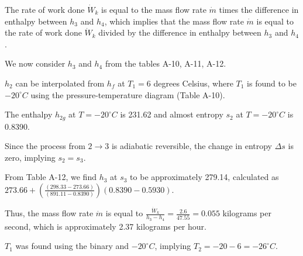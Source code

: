 The rate of work done \( \dot{W}_k \) is equal to the mass flow rate \( \dot{m} \) times the difference in enthalpy between \( h_3 \) and \( h_4 \), which implies that the mass flow rate \( \dot{m} \) is equal to the rate of work done \( \dot{W}_k \) divided by the difference in enthalpy between \( h_3 \) and \( h_4 \).

We now consider \( h_3 \) and \( h_4 \) from the tables A-10, A-11, A-12.

\( h_2 \) can be interpolated from \( h_f \) at \( T_1 = 6 \) degrees Celsius, where \( T_1 \) is found to be \(-20^\circ C\) using the pressure-temperature diagram (Table A-10).

The enthalpy \( h_{2g} \) at \( T = -20^\circ C \) is 231.62 and almost entropy \( s_2 \) at \( T = -20^\circ C \) is 0.8390.

Since the process from \( 2 \rightarrow 3 \) is adiabatic reversible, the change in entropy \( \Delta s \) is zero, implying \( s_2 = s_3 \).

From Table A-12, we find \( h_3 \) at \( s_3 \) to be approximately 279.14, calculated as \( 273.66 + \left( \frac{(298.33 - 273.66)}{(891.11 - 0.8390)} \right) (0.8390 - 0.5930) \).

Thus, the mass flow rate \( \dot{m} \) is equal to \( \frac{\dot{W}_k}{h_3 - h_4} = \frac{2.6}{47.55} = 0.055 \) kilograms per second, which is approximately 2.37 kilograms per hour.

\( T_1 \) was found using the binary and \(-20^\circ C\), implying \( T_2 = -20 - 6 = -26^\circ C \).